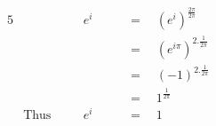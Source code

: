 \begin{alignat*}{5}
&\,&&e^i\quad&&\,=\quad\left(e^i\right)^\frac{2\pi}{2\pi}\\
&\,&&\quad&&\,=\quad\left(e^{i\pi}\right)^{2.\frac{1}{2\pi}}\\
&\,&&\quad&&\,=\quad(-1)^{2.\frac{1}{2\pi}}\\
&\,&&\quad&&\,=\quad1^\frac{1}{2\pi}\\
&\text{Thus}\quad&&e^i\quad&&\,=\quad1
\end{alignat*}
